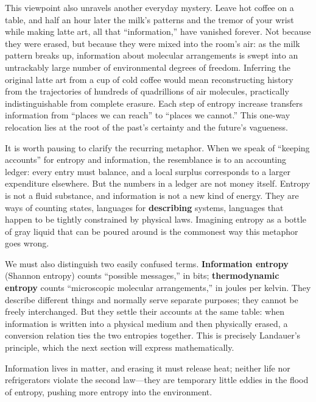 This viewpoint also unravels another everyday mystery. Leave hot coffee on a table, and half an hour later the milk's patterns and the tremor of your wrist while making latte art, all that ``information,'' have vanished forever. Not because they were erased, but because they were mixed into the room's air: as the milk pattern breaks up, information about molecular arrangements is swept into an untrackably large number of environmental degrees of freedom. Inferring the original latte art from a cup of cold coffee would mean reconstructing history from the trajectories of hundreds of quadrillions of air molecules, practically indistinguishable from complete erasure. Each step of entropy increase transfers information from ``places we can reach'' to ``places we cannot.'' This one-way relocation lies at the root of the past's certainty and the future's vagueness.

It is worth pausing to clarify the recurring metaphor. When we speak of ``keeping accounts'' for entropy and information, the resemblance is to an accounting ledger: every entry must balance, and a local surplus corresponds to a larger expenditure elsewhere. But the numbers in a ledger are not money itself. Entropy is not a fluid substance, and information is not a new kind of energy. They are ways of counting states, languages for \textbf{describing} systems, languages that happen to be tightly constrained by physical laws. Imagining entropy as a bottle of gray liquid that can be poured around is the commonest way this metaphor goes wrong.

We must also distinguish two easily confused terms. \textbf{Information entropy} (Shannon entropy) counts ``possible messages,'' in bits; \textbf{thermodynamic entropy} counts ``microscopic molecular arrangements,'' in joules per kelvin. They describe different things and normally serve separate purposes; they cannot be freely interchanged. But they settle their accounts at the same table: when information is written into a physical medium and then physically erased, a conversion relation ties the two entropies together. This is precisely Landauer's principle, which the next section will express mathematically.


\begin{oneline}
Information lives in matter, and erasing it must release heat; neither life nor refrigerators violate the second law---they are temporary little eddies in the flood of entropy, pushing more entropy into the environment.
\end{oneline}

